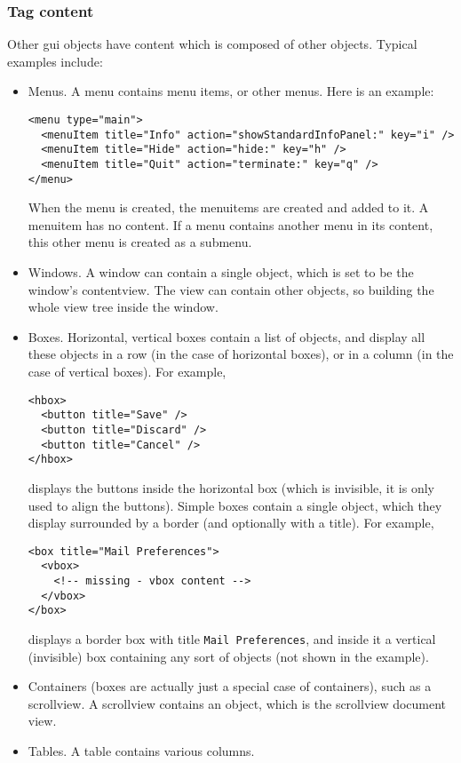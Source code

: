 \subsubsection{Tag content}
Other gui objects have content which is composed of other objects.
Typical examples include:
\begin{itemize}
\item Menus.  A menu contains menu items, or other menus.  Here is an
  example:
\begin{verbatim}
<menu type="main">
  <menuItem title="Info" action="showStandardInfoPanel:" key="i" />
  <menuItem title="Hide" action="hide:" key="h" />
  <menuItem title="Quit" action="terminate:" key="q" />
</menu>
\end{verbatim}
  When the menu is created, the menuitems are created and added to it.
  A menuitem has no content.  If a menu contains another menu in its
  content, this other menu is created as a submenu.
\item Windows.  A window can contain a single object, which is set to
  be the window's contentview.  The view can contain other objects, so
  building the whole view tree inside the window.
\item Boxes.  Horizontal, vertical boxes contain a list of objects,
  and display all these objects in a row (in the case of horizontal
  boxes), or in a column (in the case of vertical boxes).  For
  example,
\begin{verbatim}
<hbox>
  <button title="Save" />
  <button title="Discard" />
  <button title="Cancel" />
</hbox>
\end{verbatim}
  displays the buttons inside the horizontal box (which is invisible,
  it is only used to align the buttons).  Simple boxes contain a
  single object, which they display surrounded by a border (and
  optionally with a title).  For example,
\begin{verbatim}
<box title="Mail Preferences">
  <vbox>
    <!-- missing - vbox content -->
  </vbox>
</box>
\end{verbatim}
  displays a border box with title \texttt{Mail Preferences}, and
  inside it a vertical (invisible) box containing any sort of objects
  (not shown in the example).
\item Containers (boxes are actually just a special case of
  containers), such as a scrollview.  A scrollview contains an object,
  which is the scrollview document view.
\item Tables.  A table contains various columns.
\end{itemize}


